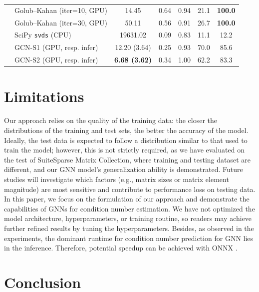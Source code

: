\documentclass[11pt,a4paper]{article}
\theoremstyle{plain}
\theoremstyle{definition}
\theoremstyle{remark}
\begin{document}
\begin{table}[ht]
{\begin{tabular}{llccccc}
& Golub--Kahan (iter=10, GPU) & 14.45 & 0.64 & 0.94 & 21.1 & \textbf{100.0} \\
& Golub--Kahan (iter=30, GPU) & 50.11 & 0.56 & 0.91 & 26.7 & \textbf{100.0} \\
& SciPy \texttt{svds} (CPU) & 19631.02 & 0.09 & 0.83 & 11.1 & 12.2 \\
& GCN-S1 (GPU, resp. infer) & 12.20 (3.64) & 0.25 & 0.93 & 70.0 & 85.6 \\
& GCN-S2 (GPU, resp. infer) & \textbf{6.68 (3.62)} & 0.34 & 1.00 & 62.2 & 83.3 \\
\bottomrule
\end{tabular}%
}
\end{table}

\section{Limitations}\label{sec:limitations}

Our approach relies on the quality of the training data: the closer the distributions of the training and test sets, the better the accuracy of the model. Ideally, the test data is expected to follow a distribution similar to that used to train the model; however, this is not strictly required, as we have evaluated on the test of SuiteSparse Matrix Collection, where training and testing dataset are different, and our GNN model’s generalization ability is demonstrated. Future studies will investigate which factors (e.g., matrix sizes or matrix element magnitude) are most sensitive and contribute to performance loss on testing data. In this paper, we focus on the formulation of our approach and demonstrate the capabilities of GNNs for condition number estimation. We have not optimized the model architecture, hyperparameters, or training routine, so readers may achieve further refined results by tuning the hyperparameters. 
Besides, as observed in the experiments, the dominant runtime for condition number prediction for GNN lies in the inference. Therefore, potential speedup can be achieved with ONNX \cite{onnxruntime}. 



\section{Conclusion}\label{sec:concludion}
\end{document}
